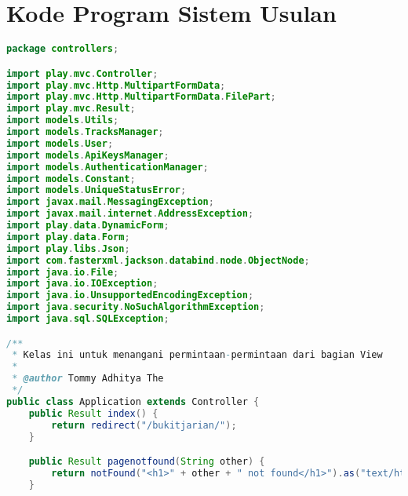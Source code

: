 \chapter{Kode Program Sistem Usulan}
\label{app:B}

\singlespacing 
%
%
\begin{lstlisting}[language=Java,basicstyle=\tiny,caption=controllers/Application.java,label={lst:application.java}]
package controllers;

import play.mvc.Controller;
import play.mvc.Http.MultipartFormData;
import play.mvc.Http.MultipartFormData.FilePart;
import play.mvc.Result;
import models.Utils;
import models.TracksManager;
import models.User;
import models.ApiKeysManager;
import models.AuthenticationManager;
import models.Constant;
import models.UniqueStatusError;
import javax.mail.MessagingException;
import javax.mail.internet.AddressException;
import play.data.DynamicForm;
import play.data.Form;
import play.libs.Json;
import com.fasterxml.jackson.databind.node.ObjectNode;
import java.io.File;
import java.io.IOException;
import java.io.UnsupportedEncodingException;
import java.security.NoSuchAlgorithmException;
import java.sql.SQLException;

/**
 * Kelas ini untuk menangani permintaan-permintaan dari bagian View
 * 
 * @author Tommy Adhitya The
 */
public class Application extends Controller {
	public Result index() {
		return redirect("/bukitjarian/");
	}

	public Result pagenotfound(String other) {
		return notFound("<h1>" + other + " not found</h1>").as("text/html");
	}


\end{lstlisting}
